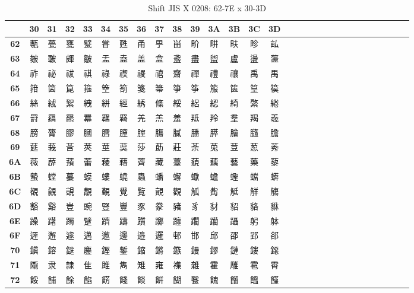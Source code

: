 \begin{table}[H]
\Fontified
\centering
\caption{Shift JIS X 0208: 62-7E x 30-3D}
\begin{tabular}{|Sc|Sc|Sc|Sc|Sc|Sc|Sc|Sc|Sc|Sc|Sc|Sc|Sc|Sc|Sc|}
\hline
 & \textbf{30} & \textbf{31} & \textbf{32} & \textbf{33} & \textbf{34} & \textbf{35} & \textbf{36} & \textbf{37} & \textbf{38} & \textbf{39} & \textbf{3A} & \textbf{3B} & \textbf{3C} & \textbf{3D} \\ \hline
\textbf{62} & 甎 & 甍 & 甕 & 甓 & 甞 & 甦 & 甬 & 甼 & 畄 & 畍 & 畊 & 畉 & 畛 & 畆 \\ \hline
\textbf{63} & 皴 & 皸 & 皹 & 皺 & 盂 & 盍 & 盖 & 盒 & 盞 & 盡 & 盥 & 盧 & 盪 & 蘯 \\ \hline
\textbf{64} & 祚 & 祕 & 祓 & 祺 & 祿 & 禊 & 禝 & 禧 & 齋 & 禪 & 禮 & 禳 & 禹 & 禺 \\ \hline
\textbf{65} & 箝 & 箘 & 箟 & 箍 & 箜 & 箚 & 箋 & 箒 & 箏 & 筝 & 箙 & 篋 & 篁 & 篌 \\ \hline
\textbf{66} & 絲 & 絨 & 絮 & 絏 & 絣 & 經 & 綉 & 絛 & 綏 & 絽 & 綛 & 綺 & 綮 & 綣 \\ \hline
\textbf{67} & 罸 & 羂 & 羆 & 羃 & 羈 & 羇 & 羌 & 羔 & 羞 & 羝 & 羚 & 羣 & 羯 & 羲 \\ \hline
\textbf{68} & 膀 & 膂 & 膠 & 膕 & 膤 & 膣 & 腟 & 膓 & 膩 & 膰 & 膵 & 膾 & 膸 & 膽 \\ \hline
\textbf{69} & 莚 & 莪 & 莟 & 莢 & 莖 & 茣 & 莎 & 莇 & 莊 & 荼 & 莵 & 荳 & 荵 & 莠 \\ \hline
\textbf{6A} & 薇 & 薜 & 蕷 & 蕾 & 薐 & 藉 & 薺 & 藏 & 薹 & 藐 & 藕 & 藝 & 藥 & 藜 \\ \hline
\textbf{6B} & 蟄 & 螳 & 蟇 & 蟆 & 螻 & 蟯 & 蟲 & 蟠 & 蠏 & 蠍 & 蟾 & 蟶 & 蟷 & 蠎 \\ \hline
\textbf{6C} & 覩 & 覦 & 覬 & 覯 & 覲 & 覺 & 覽 & 覿 & 觀 & 觚 & 觜 & 觝 & 觧 & 觴 \\ \hline
\textbf{6D} & 豁 & 谿 & 豈 & 豌 & 豎 & 豐 & 豕 & 豢 & 豬 & 豸 & 豺 & 貂 & 貉 & 貅 \\ \hline
\textbf{6E} & 躁 & 躇 & 躅 & 躄 & 躋 & 躊 & 躓 & 躑 & 躔 & 躙 & 躪 & 躡 & 躬 & 躰 \\ \hline
\textbf{6F} & 遲 & 邂 & 遽 & 邁 & 邀 & 邊 & 邉 & 邏 & 邨 & 邯 & 邱 & 邵 & 郢 & 郤 \\ \hline
\textbf{70} & 鎭 & 鎔 & 鎹 & 鏖 & 鏗 & 鏨 & 鏥 & 鏘 & 鏃 & 鏝 & 鏐 & 鏈 & 鏤 & 鐚 \\ \hline
\textbf{71} & 隴 & 隶 & 隸 & 隹 & 雎 & 雋 & 雉 & 雍 & 襍 & 雜 & 霍 & 雕 & 雹 & 霄 \\ \hline
\textbf{72} & 餒 & 餔 & 餘 & 餡 & 餝 & 餞 & 餤 & 餠 & 餬 & 餮 & 餽 & 餾 & 饂 & 饉 \\ \hline

\end{tabular}
\end{table}
